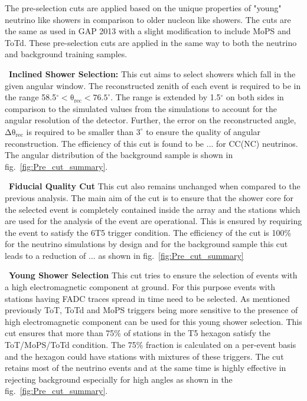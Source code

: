 The pre-selection cuts are applied based on the unique properties of "young" neutrino like showers in comparison to older nucleon like showers. The cuts are the same as used in GAP 2013 with a slight modification to include MoPS and ToTd. These pre-selection cuts are applied in the same way to both the neutrino and background training samples. 
\begin{description}
  \item ~\textbf{Inclined Shower Selection:} This cut aims to select showers which fall in the given angular window. The reconstructed zenith of each event is required to be in the range 58.5$^{\circ} < \mathrm{\theta_{rec} < 76.5^{\circ}}$. The range is extended by 1.5$^\circ$ on both sides in comparison to the simulated values from the simulations to account for the angular resolution of the detector. Further, the error on the reconstructed angle, $\mathrm{\Delta \theta_{rec}}$ is required to be smaller than $3^\circ$ to ensure the quality of angular reconstruction. The efficiency of this cut is found to be ... for CC(NC) neutrinos. The angular distribution of the background sample is shown in fig.~\ref{fig:Pre_cut_summary}.
  \item ~\textbf{Fiducial Quality Cut} This cut also remains unchanged when compared to the previous analysis. The main aim of the cut is to ensure that the shower core for the selected event is completely contained inside the array and the stations which are used for the analysis of the event are operational. This is ensured by requiring the event to satisfy the 6T5 trigger condition. The efficiency of the cut is 100\% for the neutrino simulations by design and for the background sample this cut leads to a reduction of ... as shown in fig.~\ref{fig:Pre_cut_summary}   
  \item ~\textbf{Young Shower Selection} This cut tries to ensure the selection of events with a high electromagnetic component at ground. For this purpose events with stations having FADC traces spread in time need to be selected. As mentioned previously ToT, ToTd and MoPS triggers being more sensitive to the presence of high electromagnetic component can be used for this young shower selection. This cut ensures that more than 75\% of stations in the T5 hexagon satisfy the ToT/MoPS/ToTd condition. The 75\% fraction is calculated on a per-event basis and the hexagon could have stations with mixtures of these triggers. The cut retains most of the neutrino events and at the same time is highly effective in rejecting background especially for high angles as shown in the fig.~\ref{fig:Pre_cut_summary}.

\end{description}
